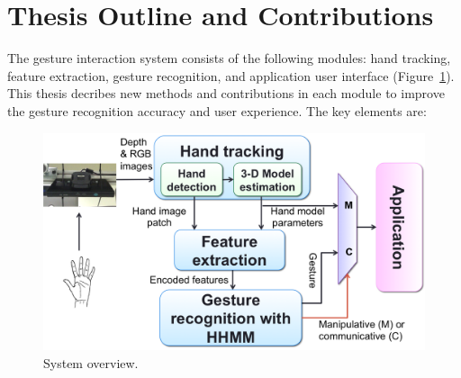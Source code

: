 \section{Thesis Outline and Contributions}
The gesture interaction system consists of the following modules: hand tracking, 
feature extraction, gesture recognition, and application user interface
(Figure~\ref{fig:overview}). This thesis decribes new methods and
contributions in each module to improve the gesture recognition accuracy and
user experience. The key elements are:

\begin{figure}[h]
\centering
\includegraphics[width=\linewidth]{figures/system_overview.png}
\caption{System overview.}
\label{fig:overview}
\end{figure}


